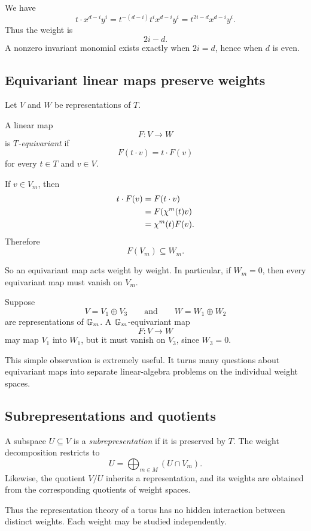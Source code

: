 We have
\[
t\cdot x^{d-i}y^i
=
t^{-(d-i)}t^i x^{d-i}y^i
=
t^{2i-d}x^{d-i}y^i.
\]
Thus the weight is
\[
2i-d.
\]
A nonzero invariant monomial exists exactly when \(2i=d\), hence when
\(d\) is even.

\subsection{Equivariant linear maps preserve weights}

Let \(V\) and \(W\) be representations of \(T\).

\begin{definition}
A linear map
\[
F:V\longrightarrow W
\]
is \emph{\(T\)-equivariant} if
\[
F(t\cdot v)=t\cdot F(v)
\]
for every \(t\in T\) and \(v\in V\).
\end{definition}

If \(v\in V_m\), then
\[
\begin{aligned}
t\cdot F(v)
&=
F(t\cdot v)\\
&=
F(\chi^{m}(t)v)\\
&=
\chi^{m}(t)F(v).
\end{aligned}
\]
Therefore
\[
F(V_m)\subseteq W_m.
\]

So an equivariant map acts weight by weight. In particular, if \(W_m=0\),
then every equivariant map must vanish on \(V_m\).

\begin{example}
Suppose
\[
V=V_1\oplus V_3
\qquad\text{and}\qquad
W=W_1\oplus W_2
\]
are representations of \(\mathbb{G}_{m}\). A \(\mathbb{G}_{m}\)-equivariant map
\[
F:V\longrightarrow W
\]
may map \(V_1\) into \(W_1\), but it must vanish on \(V_3\), since
\(W_3=0\).
\end{example}

This simple observation is extremely useful. It turns many questions
about equivariant maps into separate linear-algebra problems on the
individual weight spaces.

\subsection{Subrepresentations and quotients}

A subspace \(U\subseteq V\) is a \emph{subrepresentation} if it is
preserved by \(T\). The weight decomposition restricts to
\[
U
=
\bigoplus_{m\in M}(U\cap V_m).
\]
Likewise, the quotient \(V/U\) inherits a representation, and its
weights are obtained from the corresponding quotients of weight
spaces.

Thus the representation theory of a torus has no hidden interaction
between distinct weights. Each weight may be studied independently.

